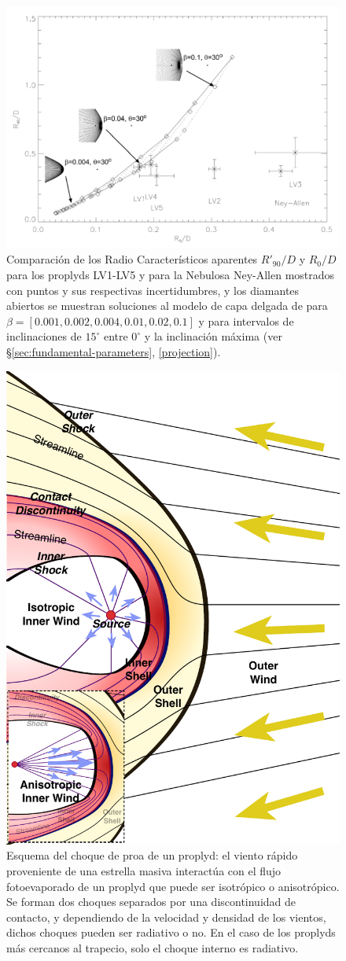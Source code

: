 \begin{figure}
  \includegraphics[width=0.7\linewidth]{./Figures/robberto}
  \caption{Comparación de los Radio Característicos aparentes $R'_{90}/D$ y $R_0/D$ para los proplyds LV1-LV5 y para la Nebulosa Ney-Allen mostrados con puntos y sus respectivas incertidumbres, y los diamantes abiertos se muestran soluciones al modelo de capa delgada de \citep{Canto:1996} para $\beta=[0.001, 0.002, 0.004, 0.01, 0.02, 0.1]$ y para intervalos de inclinaciones de $15^\circ$ entre $0^\circ$ y la inclinación máxima (ver \S \ref{sec:fundamental-parameters}, \ref{projection}).}
  \label{fig:Robberto}
\end{figure}

\begin{figure}
  \includegraphics[width=0.7\linewidth]{./Figures/generic-bowshock}
  \caption{Esquema del choque de proa de un proplyd: el viento rápido proveniente de una estrella masiva interactúa con el flujo fotoevaporado de un proplyd que puede ser isotrópico o anisotrópico. Se forman dos choques separados por una discontinuidad de contacto, y dependiendo de la velocidad y densidad de los vientos, dichos choques pueden ser radiativo o no. En el caso de los proplyds más cercanos al trapecio, solo el choque interno es radiativo.}
  \label{fig:generic-bowshock}
\end{figure}


